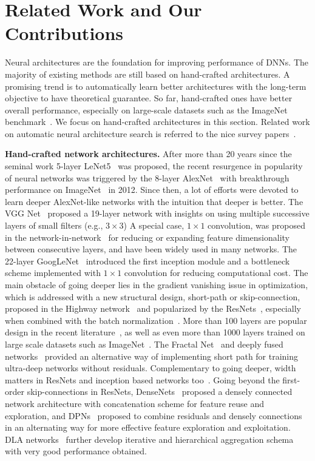 \documentclass[10pt,twocolumn,letterpaper]{article}
\begin{document}
\section{Related Work and Our Contributions}
 Neural architectures are the foundation for improving performance of DNNs. 
The majority of existing methods are still based on hand-crafted architectures. A promising trend is to automatically learn better architectures with the long-term objective to have theoretical guarantee. So far, hand-crafted ones have better overall performance, especially on large-scale datasets such as the ImageNet benchmark~\cite{ImageNet}. We focus on hand-crafted architectures in this section. Related work on automatic neural architecture search is referred to the nice survey papers~\cite{NAS-survey1,NAS-survey2}.

\textbf{Hand-crafted network architectures.} 
After more than 20 years since the seminal work 5-layer LeNet5~\cite{LeCunCNN} was proposed, the recent resurgence in popularity of neural networks was triggered by the 8-layer AlexNet~\cite{AlexNet} with breakthrough performance on ImageNet~\cite{ImageNet} in 2012.
Since then, a lot of efforts were devoted to learn deeper AlexNet-like networks with the intuition that deeper is better. The VGG Net~\cite{VGG} proposed a 19-layer network with insights on using multiple successive layers of small filters (e.g., $3\times 3$) %
A special case, $1\times 1$ convolution, was proposed in the network-in-network~\cite{NetInNet} for reducing or expanding feature dimensionality between consecutive layers, and have been widely used in many networks. %
The  22-layer GoogLeNet~\cite{GoogLeNet} introduced the first inception module and a bottleneck scheme implemented with $1\times 1$ convolution for reducing computational cost. The main obstacle of going deeper lies in the gradient vanishing issue in optimization, which is addressed with a new structural design, short-path or skip-connection, proposed in the Highway network~\cite{HighwayNet} and popularized by the ResNets~\cite{ResidualNet}, especially when combined with the batch normalization~\cite{BatchNorm}. More than 100 layers are popular design in the recent literature~\cite{ResidualNet,InceptionNet}, as well as even more than 1000 layers trained on large scale datasets such as ImageNet~\cite{StochasticResNet,PolyNet}. The Fractal Net~\cite{FractalNet} and deeply fused networks~\cite{DFN} provided an alternative way of implementing short path for training ultra-deep networks without residuals. Complementary to going deeper, width matters in ResNets and inception based networks too~\cite{WideResNet,ResNeXt,IGC1}. Going beyond the first-order  skip-connections in ResNets, DenseNets~\cite{DenseNet} proposed a densely connected network architecture with concatenation scheme for feature reuse and exploration, and DPNs~\cite{DPN} proposed to combine residuals and densely connections in an alternating way for more effective feature exploration and exploitation. DLA networks~\cite{DLA} further develop iterative and hierarchical  aggregation schema with very good performance obtained.  
\end{document}
